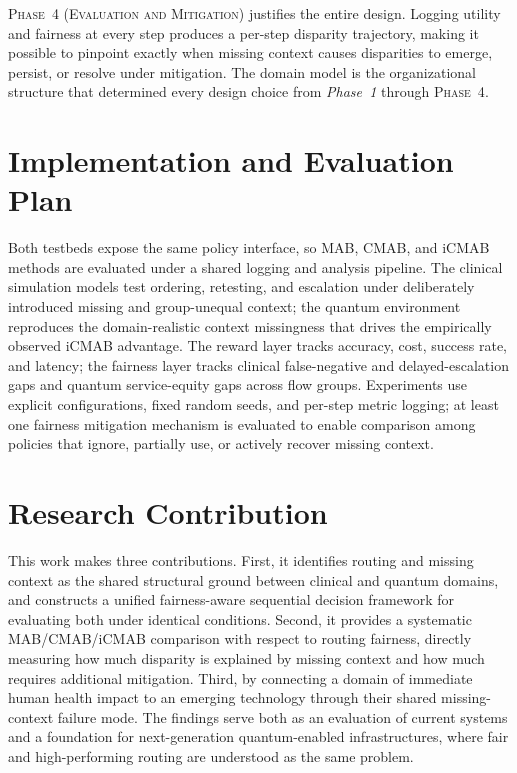 \documentclass{IEEEtran}
\begin{document}
\textsc{Phase~4 (Evaluation and Mitigation)} justifies the entire design.
Logging utility and fairness at every step produces a per-step disparity
trajectory, making it possible to pinpoint exactly when missing context
causes disparities to emerge, persist, or resolve under mitigation. The
domain model is the organizational structure that determined every design
choice from \textit{Phase~1} through \textsc{Phase~4}.

\section{Implementation and Evaluation Plan}

Both testbeds expose the same policy interface, so MAB, CMAB, and iCMAB
methods are evaluated under a shared logging and analysis pipeline. The
clinical simulation models test ordering, retesting, and escalation under
deliberately introduced missing and group-unequal context; the quantum
environment reproduces the domain-realistic context missingness that drives
the empirically observed iCMAB advantage. The reward layer tracks accuracy,
cost, success rate, and latency; the fairness layer tracks clinical
false-negative and delayed-escalation gaps and quantum service-equity gaps
across flow groups. Experiments use explicit configurations, fixed random
seeds, and per-step metric logging; at least one fairness mitigation
mechanism is evaluated to enable comparison among policies that ignore,
partially use, or actively recover missing context.

\section{Research Contribution}

This work makes three contributions. First, it identifies routing and missing
context as the shared structural ground between clinical and quantum domains,
and constructs a unified fairness-aware sequential decision framework for
evaluating both under identical conditions. Second, it provides a systematic
MAB/CMAB/iCMAB comparison with respect to routing fairness, directly
measuring how much disparity is explained by missing context and how much
requires additional mitigation. Third, by connecting a domain of immediate
human health impact to an emerging technology through their shared
missing-context failure mode. The findings serve both as an evaluation of
current systems and a foundation for next-generation quantum-enabled 
infrastructures, where fair and high-performing routing are understood as the 
same problem.
\end{document}
